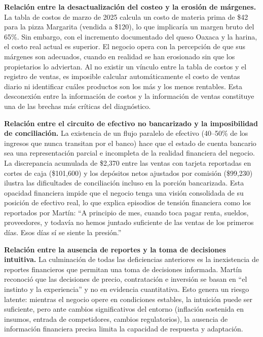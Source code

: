 \documentclass[12pt,letterpaper]{article}
\begin{document}
\textbf{Relación entre la desactualización del costeo y la erosión de márgenes.} La tabla de costos de marzo de 2025 calcula un costo de materia prima de \$42 para la pizza Margarita (vendida a \$120), lo que implicaría un margen bruto del 65\%. Sin embargo, con el incremento documentado del queso Oaxaca y la harina, el costo real actual es superior. El negocio opera con la percepción de que sus márgenes son adecuados, cuando en realidad se han erosionado sin que los propietarios lo adviertan. Al no existir un vínculo entre la tabla de costos y el registro de ventas, es imposible calcular automáticamente el costo de ventas diario ni identificar cuáles productos son los más y los menos rentables. Esta desconexión entre la información de costos y la información de ventas constituye una de las brechas más críticas del diagnóstico.

\textbf{Relación entre el circuito de efectivo no bancarizado y la imposibilidad de conciliación.} La existencia de un flujo paralelo de efectivo (40--50\% de los ingresos que nunca transitan por el banco) hace que el estado de cuenta bancario sea una representación parcial e incompleta de la realidad financiera del negocio. La discrepancia acumulada de \$2,370 entre las ventas con tarjeta reportadas en cortes de caja (\$101,600) y los depósitos netos ajustados por comisión (\$99,230) ilustra las dificultades de conciliación incluso en la porción bancarizada. Esta opacidad financiera impide que el negocio tenga una visión consolidada de su posición de efectivo real, lo que explica episodios de tensión financiera como los reportados por Martín: ``A principio de mes, cuando toca pagar renta, sueldos, proveedores, y todavía no hemos juntado suficiente de las ventas de los primeros días. Esos días sí se siente la presión.''

\textbf{Relación entre la ausencia de reportes y la toma de decisiones intuitiva.} La culminación de todas las deficiencias anteriores es la inexistencia de reportes financieros que permitan una toma de decisiones informada. Martín reconoció que las decisiones de precio, contratación e inversión se basan en ``el instinto y la experiencia'' y no en evidencia cuantitativa. Esto genera un riesgo latente: mientras el negocio opere en condiciones estables, la intuición puede ser suficiente, pero ante cambios significativos del entorno (inflación sostenida en insumos, entrada de competidores, cambios regulatorios), la ausencia de información financiera precisa limita la capacidad de respuesta y adaptación.
\end{document}
